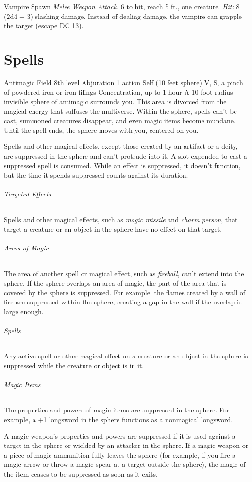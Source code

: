 \documentclass[10pt,a4paper,twoside,bg=print,twocolumn,openany,nodeprecatedcode]{dndbook}
\begin{document}
\begin{DndMonster}[float=t]{Vampire Spawn}
\textsl{Melee Weapon Attack:} 6 to hit, reach 5 ft., one creature. \textsl{Hit:} 8 (2d4 + 3) slashing damage. Instead of dealing damage, the vampire can grapple the target (escape DC 13).

\end{DndMonster}


\chapter{Spells}


\DndSpellHeader%
{Antimagic Field}
{8th level Abjuration}
{1 action}
{Self (10 feet sphere)}
{V, S, a pinch of powdered iron or iron filings}
{Concentration, up to 1 hour}
A 10-foot-radius invisible sphere of antimagic surrounds you. This area is divorced from the magical energy that suffuses the multiverse. Within the sphere, spells can't be cast, summoned creatures disappear, and even magic items become mundane. Until the spell ends, the sphere moves with you, centered on you.

Spells and other magical effects, except those created by an artifact or a deity, are suppressed in the sphere and can't protrude into it. A slot expended to cast a suppressed spell is consumed. While an effect is suppressed, it doesn't function, but the time it spends suppressed counts against its duration.

\subparagraph{Targeted Effects}
Spells and other magical effects, such as \textit{magic missile} and \textit{charm person}, that target a creature or an object in the sphere have no effect on that target.

\subparagraph{Areas of Magic}
The area of another spell or magical effect, such as \textit{fireball}, can't extend into the sphere. If the sphere overlaps an area of magic, the part of the area that is covered by the sphere is suppressed. For example, the flames created by a wall of fire are suppressed within the sphere, creating a gap in the wall if the overlap is large enough.

\subparagraph{Spells}
Any active spell or other magical effect on a creature or an object in the sphere is suppressed while the creature or object is in it.

\subparagraph{Magic Items}
The properties and powers of magic items are suppressed in the sphere. For example, a +1 longsword in the sphere functions as a nonmagical longsword.

A magic weapon's properties and powers are suppressed if it is used against a target in the sphere or wielded by an attacker in the sphere. If a magic weapon or a piece of magic ammunition fully leaves the sphere (for example, if you fire a magic arrow or throw a magic spear at a target outside the sphere), the magic of the item ceases to be suppressed as soon as it exits.
\end{document}
